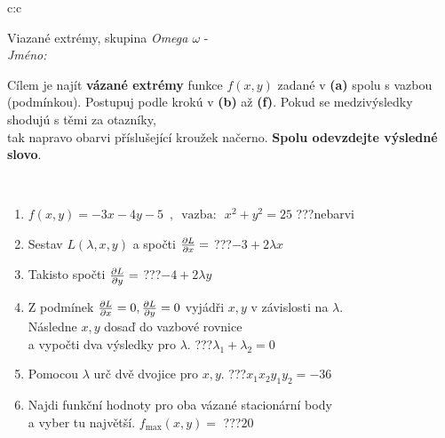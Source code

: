 \documentclass[10pt]{report}
\begin{document}
\begin{tabular}{c:c}
\begin{minipage}[c][104.5mm][t]{0.5\linewidth}
\begin{center}
\vspace{7mm}
{\huge Viazané extrémy, skupina \textit{Omega $\omega$} -}\\[5mm]
\textit{Jméno:}\phantom{xxxxxxxxxxxxxxxxxxxxxxxxxxxxxxxxxxxxxxxxxxxxxxxxxxxxxxxxxxxxxxxxx}\\[5mm]
\begin{minipage}{0.95\linewidth}
\begin{center}
Cílem je najít \textbf{vázané extrémy} funkce $f(x,y)$ zadané v \textbf{(a)} spolu s vazbou (podmínkou). Postupuj podle krokú v \textbf{(b)} až \textbf{(f)}. Pokud se medzivýsledky shodujú s těmi za otazníky,\\tak napravo obarvi příslušející kroužek načerno. \textbf{Spolu odevzdejte výsledné slovo}.
\end{center}
\end{minipage}
\\[1mm]
\begin{minipage}{0.79\linewidth}
\begin{center}
\begin{varwidth}{\linewidth}
\begin{enumerate}
\normalsize
\item $f(x,y)=-3x-4y-5 \enspace , \enspace \mathrm{vazba:} \enspace x^2+y^2=25$\quad \dotfill\; ???\;\dotfill \quad nebarvi
\item Sestav $L(\lambda,x,y)$ a spočti $\pdv{L}{x}=$\quad \dotfill\; ???\;\dotfill \quad $-3+2\lambda x$
\item Takisto spočti $\pdv{L}{y}=$\quad \dotfill\; ???\;\dotfill \quad $-4+2\lambda y$
\item Z podmínek $\pdv{L}{x}=0 , \pdv{L}{y}=0$ vyjádři $x,y$ v závislosti na $\lambda$.\\ \phantom{xxxxxx}Následne $x,y$ dosaď do vazbové rovnice\\ \phantom{xxxxxx}a vypočti dva výsledky pro $\lambda$.\quad \dotfill\; ???\;\dotfill \quad $\lambda_1+\lambda_2=0$
\item Pomocou $\lambda$ urč dvě dvojice pro $x,y$.\quad \dotfill\; ???\;\dotfill \quad $x_1 x_2 y_1 y_2=-36$
\item Najdi funkční hodnoty pro oba vázané stacionární body\\ \phantom{xxxxxx}a vyber tu najvětší. $f_{\text{max}}(x,y)=$\quad \dotfill\; ???\;\dotfill \quad $20$

\end{enumerate}
\end{varwidth}
\end{center}
\end{minipage}
\end{center}
\end{minipage}
\end{tabular}
\end{document}
